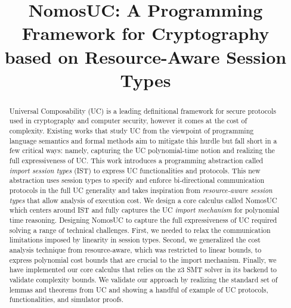 \documentclass[acmsmall,screen,review,anonymous]{acmart}
\begin{document}
\title{NomosUC: A Programming Framework for Cryptography based on Resource-Aware Session Types\\
}




\begin{abstract}
  Universal Composability (UC) is a leading definitional framework for secure protocols used in
  cryptography and computer security, however it comes at the cost of complexity.
  Existing works that study UC from the viewpoint of programming language semantics and formal
  methods aim to mitigate this hurdle but fall short in a few critical ways:
  namely, capturing the UC polynomial-time notion and realizing the full expressiveness of UC.
  This work introduces a programming abstraction called \emph{import
  session types} (IST) to express UC functionalities and protocols.
  This new abstraction uses session types to specify and enforce bi-directional communication protocols
  in the full UC generality and takes inspiration from \emph{resource-aware session types} that allow analysis of execution cost.
  We design a core calculus called NomosUC which centers around IST and fully captures the UC \emph{import mechanism}
  for polynomial time reasoning.
  Designing NomosUC to capture the full expressiveness of UC required solving a range of technical challenges.
  First, we needed to relax the communication limitations imposed by linearity in session types.
  Second, we generalized the cost analysis technique from resource-aware, which was restricted to linear bounds,
  to express polynomial cost bounds that are crucial to the import mechanism.
  Finally, we have implemented our core calculus that relies on the z3 SMT solver in its backend
  to validate complexity bounds.
  We validate our approach by realizing the standard set of lemmas and theorems from UC
  and showing a handful of example of UC protocols, functionalities, and simulator proofs.
\end{abstract}
\end{document}
